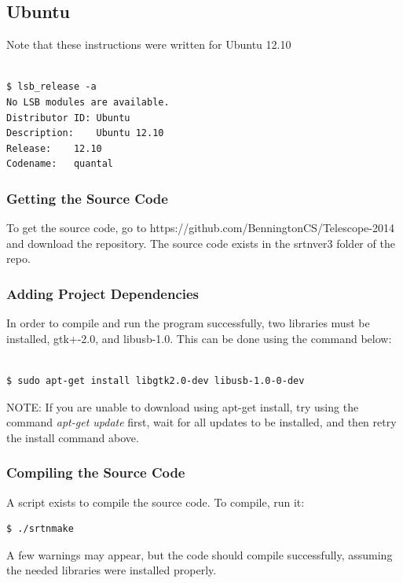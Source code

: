 \documentclass[11pt]{article} %
\begin{document}

\subsection{Ubuntu}

Note that these instructions were written for Ubuntu 12.10
\\ \\
\begin{lstlisting}[frame=single]
$ lsb_release -a
No LSB modules are available.
Distributor ID: Ubuntu
Description:    Ubuntu 12.10
Release:    12.10
Codename:   quantal
\end{lstlisting}



\subsubsection{Getting the Source Code}
To get the source code, go to https://github.com/BenningtonCS/Telescope-2014 and download the repository. The source code exists in the srtnver3 folder of the repo.


\subsubsection{Adding Project Dependencies}
 In order to compile and run the program successfully, two libraries must be installed, gtk+-2.0, and libusb-1.0. This can be done using the command below:
\\ \\
\begin{lstlisting}[frame=single]
$ sudo apt-get install libgtk2.0-dev libusb-1.0-0-dev
\end{lstlisting}

\noindent NOTE: If you are unable to download using apt-get install, try using the command \emph{apt-get update} first, wait for all updates to be installed, and then retry the install command above.


\subsubsection{Compiling the Source Code}
A script exists to compile the source code. To compile, run it:
\begin{lstlisting}[frame=single]
$ ./srtnmake
\end{lstlisting}
A few warnings may appear, but the code should compile successfully, assuming the needed libraries were installed properly.
\end{document}
